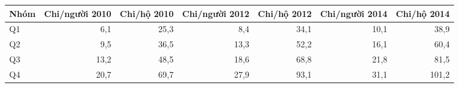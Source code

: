 \begin{tabular}{lrrrrrr}
\toprule
Nhóm & Chi/người 2010 & Chi/hộ 2010 & Chi/người 2012 & Chi/hộ 2012 & Chi/người 2014 & Chi/hộ 2014 \\
\midrule
Q1 & 6,1 & 25,3 & 8,4 & 34,1 & 10,1 & 38,9 \\
Q2 & 9,5 & 36,5 & 13,3 & 52,2 & 16,1 & 60,4 \\
Q3 & 13,2 & 48,5 & 18,6 & 68,8 & 21,8 & 81,5 \\
Q4 & 20,7 & 69,7 & 27,9 & 93,1 & 31,1 & 101,2 \\
\bottomrule
\end{tabular}
